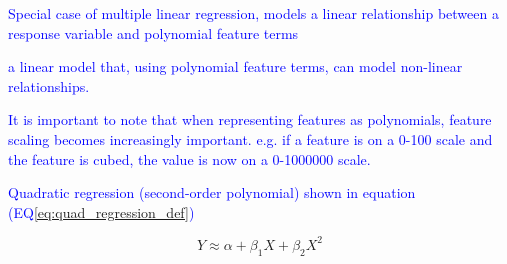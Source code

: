 \textcolor{blue}{Special case of multiple linear regression, models a linear relationship between a response variable and polynomial feature terms}

\textcolor{blue}{a linear model that, using polynomial feature terms, can model non-linear relationships.}

\textcolor{blue}{It is important to note that when representing features as polynomials, feature scaling becomes increasingly important. e.g. if a feature is on a 0-100 scale and the feature is cubed, the value is now on a 0-1000000 scale.}

\textcolor{blue}{Quadratic regression (second-order polynomial) shown in equation (EQ\ref{eq:quad_regression_def})}

\begin{equation}
{Y \approx \alpha + \beta_1 X + \beta_2 X^2}
\label{eq:quad_regression_def}
\end{equation}








